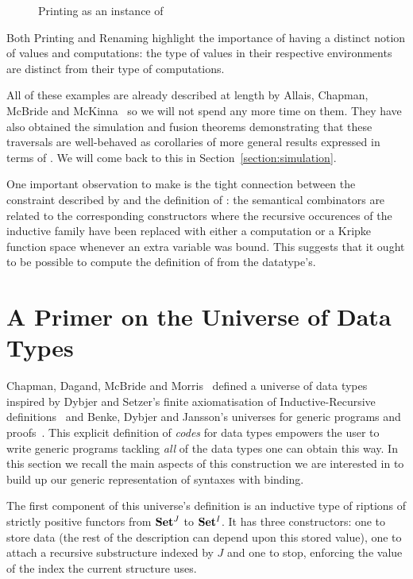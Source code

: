 \begin{figure}[h]
\caption{Printing as an instance of }
\end{figure}

Both Printing and Renaming highlight the importance of having a distinct
notion of values and computations: the type of values in their respective
environments are distinct from their type of computations.

All of these examples are already described at length by Allais, Chapman,
McBride and McKinna~\citeyear{allais2017type} so we will not spend any
more time on them. They have also obtained the simulation and fusion
theorems demonstrating that these traversals are well-behaved as
corollaries of more general results expressed in terms of .
We will come back to this in Section~\ref{section:simulation}.

One important observation to make is the tight connection between the
constraint described by  and the definition of : the
semantical combinators are related to the corresponding constructors
where the recursive occurences of the inductive family have been replaced
with either a computation or a Kripke function space whenever an
extra variable was bound. This suggests that it ought to be possible
to compute the definition of  from the datatype's.




\section{A Primer on the Universe of Data Types}

Chapman, Dagand, McBride and Morris~\citeyear{Chapman:2010:GAL:1863543.1863547}
defined a universe of data types inspired by Dybjer and Setzer's
finite axiomatisation of Inductive-Recursive definitions~\citeyear{Dybjer1999}
and Benke, Dybjer and Jansson's universes for generic programs and proofs~\citeyear{benke-ugpp}.
This explicit definition of \emph{codes} for data types empowers the
user to write generic programs tackling \emph{all} of the data types
one can obtain this way. In this section we recall the main aspects
of this construction we are interested in to build up our generic
representation of syntaxes with binding.

The first component of this universe's definition is an inductive type
of riptions of strictly positive functors from $\mathbf{Set}{}^J$ to
$\mathbf{Set}{}^I$. It has three constructors: one to store data (the rest of
the description can depend upon this stored value), one to attach a
recursive substructure indexed by $J$ and one to stop, enforcing the
value of the index the current structure uses.

